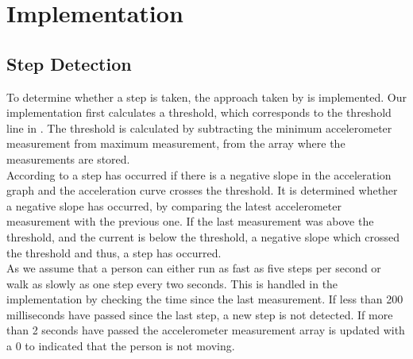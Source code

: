 \section{Implementation}
\subsection{Step Detection}\label{sec:stepCnt}
To determine whether a step is taken, the approach taken by \citet{zhao:pedometer} is implemented. Our implementation first calculates a threshold, which corresponds to the threshold line in . The threshold is calculated by subtracting the minimum accelerometer measurement from maximum measurement, from the array where the measurements are stored.\\

According to \citet[p. 2]{zhao:pedometer} a step has occurred if there is a negative slope in the acceleration graph and the acceleration curve crosses the threshold. It is determined whether a negative slope has occurred, by comparing the latest accelerometer measurement with the previous one. If the last measurement was above the threshold, and the current is below the threshold, a negative slope which crossed the threshold and thus, a step has occurred.\\

As \citet[p. 2]{zhao:pedometer} we assume that a person can either run as fast as five steps per second or walk as slowly as one step every two seconds. This is handled in the implementation by checking the time since the last measurement. If less than 200 milliseconds have passed since the last step, a new step is not detected. If more than 2 seconds have passed the accelerometer measurement array is updated with a 0 to indicated that the person is not moving.\\


